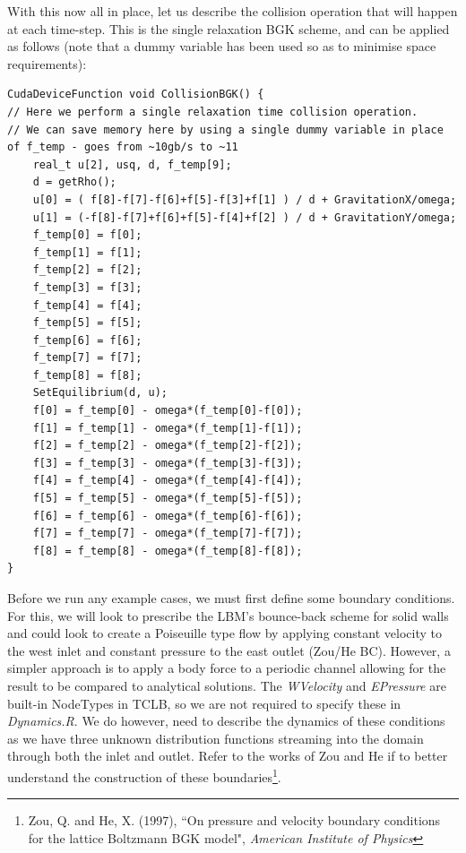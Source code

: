 \documentclass[12pt,a4paper]{report}
\begin{document}
With this now all in place, let us describe the collision operation that will happen at each time-step. This is the single relaxation BGK scheme, and can be applied as follows (note that a dummy variable has been used so as to minimise space requirements):
\begin{lstlisting}
CudaDeviceFunction void CollisionBGK() {
// Here we perform a single relaxation time collision operation.
// We can save memory here by using a single dummy variable in place of f_temp - goes from ~10gb/s to ~11
	real_t u[2], usq, d, f_temp[9];
	d = getRho();
	u[0] = ( f[8]-f[7]-f[6]+f[5]-f[3]+f[1] ) / d + GravitationX/omega;
	u[1] = (-f[8]-f[7]+f[6]+f[5]-f[4]+f[2] ) / d + GravitationY/omega;
	f_temp[0] = f[0];
	f_temp[1] = f[1];
	f_temp[2] = f[2];
	f_temp[3] = f[3];
	f_temp[4] = f[4];
	f_temp[5] = f[5];
	f_temp[6] = f[6];
	f_temp[7] = f[7];
	f_temp[8] = f[8];
	SetEquilibrium(d, u);
	f[0] = f_temp[0] - omega*(f_temp[0]-f[0]);	
	f[1] = f_temp[1] - omega*(f_temp[1]-f[1]);
	f[2] = f_temp[2] - omega*(f_temp[2]-f[2]);
	f[3] = f_temp[3] - omega*(f_temp[3]-f[3]);	
	f[4] = f_temp[4] - omega*(f_temp[4]-f[4]);
	f[5] = f_temp[5] - omega*(f_temp[5]-f[5]);
	f[6] = f_temp[6] - omega*(f_temp[6]-f[6]);	
	f[7] = f_temp[7] - omega*(f_temp[7]-f[7]);
	f[8] = f_temp[8] - omega*(f_temp[8]-f[8]);
}
\end{lstlisting}

Before we run any example cases, we must first define some boundary conditions. For this, we will look to prescribe the LBM's bounce-back scheme for solid walls and could look to create a Poiseuille type flow by applying constant velocity to the west inlet and constant pressure to the east outlet (Zou/He BC). However, a simpler approach is to apply a body force to a periodic channel allowing for the result to be compared to analytical solutions. The \textit{WVelocity} and \textit{EPressure} are built-in NodeTypes in TCLB, so we are not required to specify these in \textit{Dynamics.R}. We do however, need to describe the dynamics of these conditions as we have three unknown distribution functions streaming into the domain through both the inlet and outlet. Refer to the works of Zou and He if to better understand the construction of these boundaries\footnote{Zou, Q. and He, X. (1997), ``On pressure and velocity boundary conditions for the lattice Boltzmann BGK model", \textit{American Institute of Physics}}.\\
\end{document}
